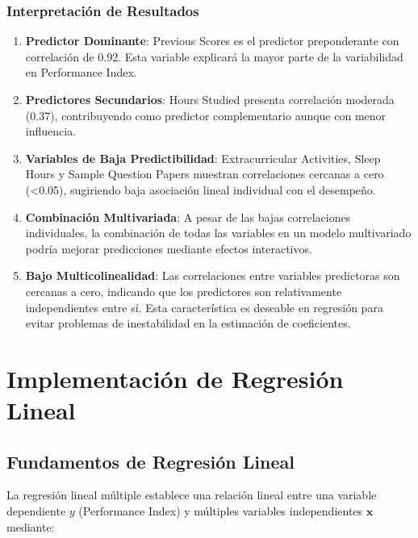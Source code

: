 \documentclass[conference]{IEEEtran}
\begin{document}
\subsubsection{Interpretación de Resultados}

\begin{enumerate}
\item \textbf{Predictor Dominante}: Previous Scores es el predictor preponderante con correlación de 0.92. Esta variable explicará la mayor parte de la variabilidad en Performance Index.

\item \textbf{Predictores Secundarios}: Hours Studied presenta correlación moderada (0.37), contribuyendo como predictor complementario aunque con menor influencia.

\item \textbf{Variables de Baja Predictibilidad}: Extracurricular Activities, Sleep Hours y Sample Question Papers muestran correlaciones cercanas a cero (<0.05), sugiriendo baja asociación lineal individual con el desempeño.

\item \textbf{Combinación Multivariada}: A pesar de las bajas correlaciones individuales, la combinación de todas las variables en un modelo multivariado podría mejorar predicciones mediante efectos interactivos.

\item \textbf{Bajo Multicolinealidad}: Las correlaciones entre variables predictoras son cercanas a cero, indicando que los predictores son relativamente independientes entre sí. Esta característica es deseable en regresión para evitar problemas de inestabilidad en la estimación de coeficientes.

\end{enumerate}

\section{Implementación de Regresión Lineal}

\subsection{Fundamentos de Regresión Lineal}

La regresión lineal múltiple establece una relación lineal entre una variable dependiente $y$ (Performance Index) y múltiples variables independientes $\mathbf{x}$ mediante:
\end{document}
